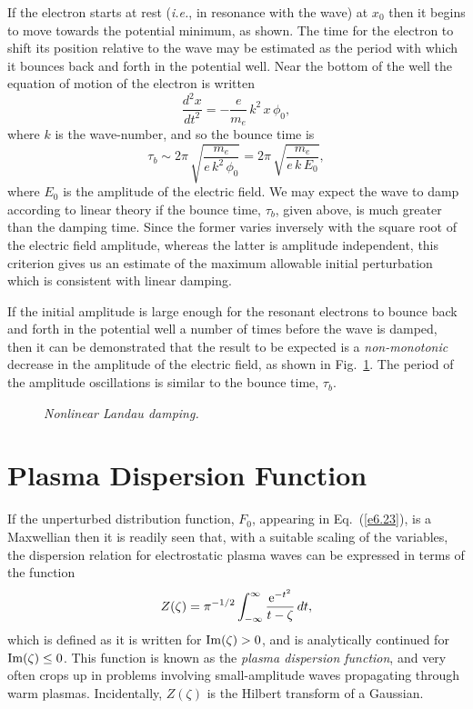 If the electron starts at rest ({\em i.e.}, in resonance with the wave) at $x_0$ 
then it begins to move towards the potential minimum, as shown. The time for
the electron to shift its position relative to the wave may be estimated
as the period with which it bounces back and forth in the potential well.
Near the bottom of the well the equation of motion of the electron is written
\begin{equation}
\frac{d^2 x}{dt^2} = - \frac{e}{m_e}\,k^2\,x\,\phi_0,
\end{equation}
where $k$ is the wave-number, and so the bounce time is
\begin{equation}
\tau_b \sim 2\pi\,\sqrt{\frac{m_e}{e\,k^2\,\phi_0}} = 
2\pi\,\sqrt{\frac{m_e}{e\,k\,E_0}},
\end{equation}
where $E_0$ is the amplitude of the electric field. We may expect the wave
to damp according to linear theory if the bounce time, $\tau_b$, given
above, is much greater than the damping time. Since the former varies
inversely with the square root of the electric field amplitude, whereas the
latter is amplitude independent, this criterion gives us an estimate of
the maximum allowable initial perturbation which is consistent with linear
damping. 

If the initial amplitude is large enough for the resonant electrons to
bounce back and forth in the potential well a number of times before the
wave is damped, then it can be demonstrated that the result to be expected is
a {\em non-monotonic}\/ decrease in the amplitude of the electric field, as shown
in Fig.~\ref{f35}. The period of the amplitude oscillations is similar to the bounce
time, $\tau_b$. 

\begin{figure}
\epsfysize=2.5in
\centerline{}
\caption{\em Nonlinear Landau damping.}\label{f35}
\end{figure}

\section{Plasma Dispersion Function}
If the unperturbed distribution function, $F_0$, appearing in Eq.~(\ref{e6.23}), is
a Maxwellian then it is readily seen that, with a suitable scaling of the
variables, the dispersion relation for electrostatic
plasma waves can be expressed in terms of the
function
\begin{equation}
Z(\zeta) = \pi^{-1/2}\int_{-\infty}^{\infty} \frac{{\rm e}^{-t^2}}{t-\zeta}\,dt,
\end{equation}
which is defined as it is written for ${\rm Im}(\zeta)>0$, and is
analytically continued  for ${\rm Im}(\zeta)\leq 0$. This function is
known as the {\em plasma dispersion function}, and very often crops up
in problems involving small-amplitude waves propagating through 
warm plasmas. Incidentally, $Z(\zeta)$ is the Hilbert transform of a Gaussian.

